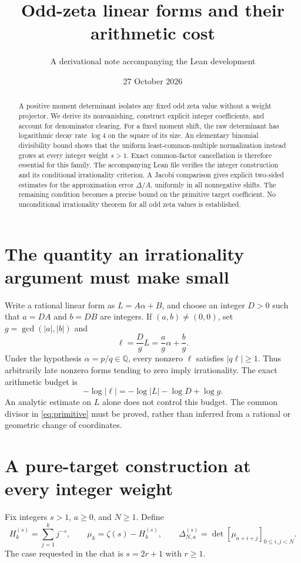 \documentclass[11pt]{article}
\title{Odd-zeta linear forms and their arithmetic cost}
\author{A derivational note accompanying the Lean development}
\date{27 October 2026}
\newcommand{\HH}[2]{H_{#1}^{(#2)}}
\newcommand{\Q}{\mathbb Q}
\begin{document}
\maketitle
\begin{abstract}
A positive moment determinant isolates any fixed odd zeta value without a
weight projector. We derive its nonvanishing, construct explicit integer
coefficients, and account for denominator clearing. For a fixed moment shift,
the raw determinant has logarithmic decay rate $\log 4$ on the square of its
size. An elementary binomial divisibility bound shows that the uniform
least-common-multiple normalization instead grows at every integer weight
$s>1$. Exact common-factor cancellation is therefore essential for this
family. The accompanying Lean file verifies the integer construction and
its conditional irrationality criterion. A Jacobi comparison gives explicit
two-sided estimates for the approximation error $\Delta/A$, uniformly in
all nonnegative shifts. The remaining condition becomes a precise bound
on the primitive target coefficient. No unconditional irrationality
theorem for all odd zeta values is established.
\end{abstract}

\section{The quantity an irrationality argument must make small}
Write a rational linear form as $L=A\alpha+B$, and choose an integer
$D>0$ such that $a=DA$ and $b=DB$ are integers. If $(a,b)\ne(0,0)$, set
$g=\gcd(|a|,|b|)$ and
\begin{equation}
 \ell=\frac{D}{g}L=\frac ag\alpha+\frac bg .
 \label{eq:primitive}
\end{equation}
Under the hypothesis $\alpha=p/q\in\Q$, every nonzero $\ell$ satisfies
$|q\ell|\ge1$. Thus arbitrarily late nonzero forms tending to zero imply
irrationality. The exact arithmetic budget is
\begin{equation}
 -\log|\ell|=-\log|L|-\log D+\log g .
 \label{eq:budget}
\end{equation}
An analytic estimate on $L$ alone does not control this budget.
The common divisor in \eqref{eq:primitive} must be proved, rather than
inferred from a rational or geometric change of coordinates.

\section{A pure-target construction at every integer weight}
Fix integers $s>1$, $a\ge0$, and $N\ge1$. Define
\begin{equation}
 \HH{k}{s}=\sum_{j=1}^k j^{-s},\qquad
 \mu_k=\zeta(s)-\HH{k}{s},\qquad
 \Delta_{N,a}^{(s)}=\det[\mu_{a+i+j}]_{0\le i,j<N}.
 \label{eq:moment}
\end{equation}
The case requested in the chat is $s=2r+1$ with $r\ge1$.
\end{document}
